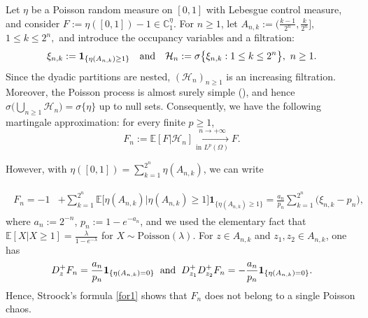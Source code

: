 \documentclass[ECP,preprint]{ejpecp}
\newcommand{\E}{\mathbb{E}}
\newcommand{\PP}{\mathbb{P}}
\newcommand{\ind}{\mathbf{1}}
\newcommand{\cH}{\mathcal{H}}
\newcommand{\bC}{\mathbb{C}^\eta}
\newcommand{\AND}{\hspace{2mm}{\rm and}\hspace{2mm}}
\newcommand{\noi}{\noindent}
\newcommand{\s}{\sigma}
\begin{document}
\begin{example} \label{ex1}
\rm
Let $\eta$ be a Poisson random
measure on $[0,1]$ with Lebesgue control measure, and consider
$
F
:=
\eta([0,1])-1
\in\bC_1.$
For $n\geq1$, let
$
A_{n,k}
:=
\big(   \frac{k-1}{2^n}, \frac{k}{2^n}  \bigr],
$
$1\leq k\leq 2^n,
$
and introduce the occupancy variables and a filtration:
\[
\xi_{n,k}
:=
\ind_{\{\eta(A_{n,k})\geq1\}}
\quad
{\rm and}
\quad
\cH_n
:=
\s\big\{
\xi_{n,k}:1\leq k\leq2^n
\big\}, \,\,
n\geq 1.
\]
Since the dyadic partitions are nested, $(\cH_n)_{n\geq1}$ is an
increasing filtration.  Moreover, the Poisson process is almost surely
simple (\cite[Proposition 6.9]{LP18}), and hence
$\s\big( 
\bigcup_{n\geq1}\cH_n \big)
=
\s\{\eta\}$
up to null sets.
Consequently, we have the following martingale approximation:
for every finite $p \geq 1$,
\[
F_n
:=
\E[F | \cH_n]
\xrightarrow[\text{in $L^p(\Omega)$}]{n\to+\infty} F.
\]

\noi
However, with $\eta([0,1]) =  \sum_{k=1}^{2^n} \eta(A_{n,k})$,
we can write


\noi
\begin{align*}  %
\begin{aligned} 
F_n
= -1 &+   \sum_{k=1}^{2^n} 
 \E\big[ \eta(A_{n,k} ) |   \eta(A_{n,k} ) \geq 1 \big] \ind_{\{  \eta(A_{n,k} ) \geq 1  \} }  
 =\frac{a_n}{p_n}
\sum_{k=1}^{2^n}
\bigl(\xi_{n,k}-p_n\bigr),
\end{aligned}
\end{align*}
where
$
a_n:=2^{-n}$,
$p_n:=1-e^{-a_n}$,
and we used the elementary fact that $\E[ X | X\geq 1] = \frac{\lambda}{1 - e^{-\lambda}}$
for $X\sim\text{Poisson}(\lambda)$.
For $z\in A_{n,k}$ and
$z_1,z_2\in A_{n,k}$, one has
\[
D_z^+F_n
= \frac{a_n}{p_n} \ind_{ \{  \eta(A_{n,k}) =0 \}}
\AND
 D^+_{z_1}D^+_{z_2}F_n 
=
- \frac{a_n}{p_n} \ind_{ \{  \eta(A_{n,k}) =0 \}}.
\]
Hence,
Stroock's formula \eqref{for1}   shows that 
 $F_n$ does not
belong to a single Poisson chaos.



 

\end{example} 
\end{document}
